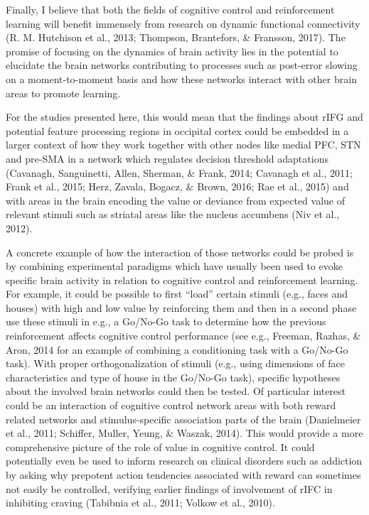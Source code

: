 \documentclass[12pt,openany]{book}
\theoremstyle{definition}
\theoremstyle{definition}
\theoremstyle{definition}
\theoremstyle{remark}
\begin{document}
Finally, I believe that both the fields of cognitive control and
reinforcement learning will benefit immensely from research on dynamic
functional connectivity (R. M. Hutchison et al., 2013; Thompson,
Brantefors, \& Fransson, 2017). The promise of focusing on the dynamics
of brain activity lies in the potential to elucidate the brain networks
contributing to processes such as post-error slowing on a
moment-to-moment basis and how these networks interact with other brain
areas to promote learning.

For the studies presented here, this would mean that the findings about
rIFG and potential feature processing regions in occipital cortex could
be embedded in a larger context of how they work together with other
nodes like medial PFC, STN and pre-SMA in a network which regulates
decision threshold adaptations (Cavanagh, Sanguinetti, Allen, Sherman,
\& Frank, 2014; Cavanagh et al., 2011; Frank et al., 2015; Herz, Zavala,
Bogacz, \& Brown, 2016; Rae et al., 2015) and with areas in the brain
encoding the value or deviance from expected value of relevant stimuli
such as striatal areas like the nucleus accumbens (Niv et al., 2012).

A concrete example of how the interaction of those networks could be
probed is by combining experimental paradigms which have usually been
used to evoke specific brain activity in relation to cognitive control
and reinforcement learning. For example, it could be possible to first
``load'' certain stimuli (e.g., faces and houses) with high and low
value by reinforcing them and then in a second phase use these stimuli
in e.g., a Go/No-Go task to determine how the previous reinforcement
affects cognitive control performance (see e.g., Freeman, Razhas, \&
Aron, 2014 for an example of combining a conditioning task with a
Go/No-Go task). With proper orthogonalization of stimuli (e.g., using
dimensions of face characteristics and type of house in the Go/No-Go
task), specific hypotheses about the involved brain networks could then
be tested. Of particular interest could be an interaction of cognitive
control network areas with both reward related networks and
stimulus-specific association parts of the brain (Danielmeier et al.,
2011; Schiffer, Muller, Yeung, \& Waszak, 2014). This would provide a
more comprehensive picture of the role of value in cognitive control. It
could potentially even be used to inform research on clinical disorders
such as addiction by asking why prepotent action tendencies associated
with reward can sometimes not easily be controlled, verifying earlier
findings of involvement of rIFC in inhibiting craving (Tabibnia et al.,
2011; Volkow et al., 2010).
\end{document}
